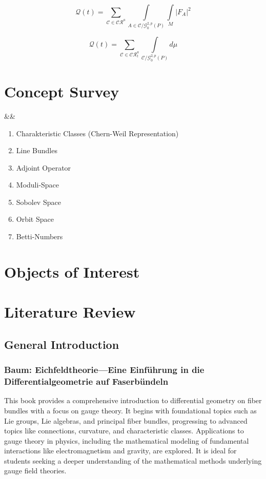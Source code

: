 \documentclass[10pt, letterpaper]{article}
\newenvironment{romanenum}[1][]
  {%
    \ifx&#1&
    \else
      \textbf{#1}\quad
    \fi
    \begin{enumerate}[label=\roman*)]
  }
  {%
    \end{enumerate}%
  }
\begin{document}
$$\mathcal{Q}(t)=\sum\limits_{\mathcal{C}\in\mathcal{CR}^a}\int\limits_{A\in\mathcal{C}/\mathcal{G}_0^{2,p}(P)}\int\limits_{M}|F_A|^2$$

$$\mathcal{Q}(t)=\sum\limits_{\mathcal{C}\in\mathcal{CR}^a_t}\int\limits_{\mathcal{C}/\mathcal{G}_0^{2,p}(P)}d\mu$$


\vspace{1cm}

\section{Concept Survey}


\begin{romanenum}
    \item Charakteristic Classes (Chern-Weil Representation)
    \item Line Bundles
    \item Adjoint Operator
    \item Moduli-Space
    \item Sobolev Space
    \item Orbit Space
    \item Betti-Numbers
\end{romanenum}




\section{Objects of Interest}





\section{Literature Review}





\subsection{General Introduction}

\subsubsection{Baum: Eichfeldtheorie—Eine Einführung in die Differentialgeometrie auf Faserbündeln \cite{baum2014eichfeld}} 
This book provides a comprehensive introduction to differential geometry on fiber bundles with a focus on gauge theory. It begins with foundational topics such as Lie groups, Lie algebras, and principal fiber bundles, progressing to advanced topics like connections, curvature, and characteristic classes. Applications to gauge theory in physics, including the mathematical modeling of fundamental interactions like electromagnetism and gravity, are explored. It is ideal for students seeking a deeper understanding of the mathematical methods underlying gauge field theories.
\end{document}
